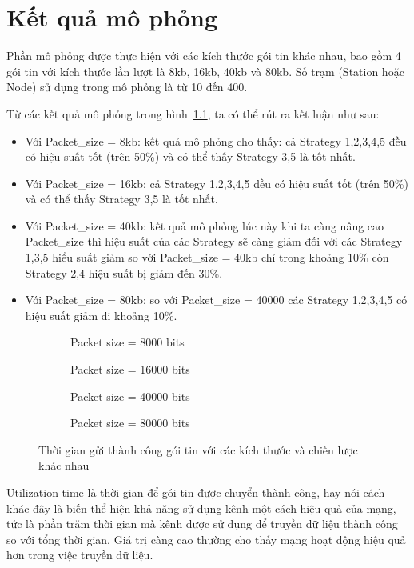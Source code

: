 \chapter{Kết quả mô phỏng}
\label{ch::chapter3}

Phần mô phỏng được thực hiện với các kích thước gói tin khác nhau, bao gồm 4 gói tin với kích thước lần lượt là 8kb, 16kb, 40kb và 80kb. Số trạm (Station hoặc Node) sử dụng trong mô phỏng là từ 10 đến 400.

Từ các kết quả mô phỏng trong hình~\ref{fig:result}, ta có thể rút ra kết luận như sau:
\begin{itemize}
    \item Với Packet\_size = 8kb: kết quả mô phỏng cho thấy: cả Strategy 1,2,3,4,5 đều có hiệu suất tốt (trên 50\%) và có thể thấy Strategy 3,5 là tốt nhất.
    \item Với Packet\_size = 16kb: cả Strategy 1,2,3,4,5 đều có hiệu suất tốt (trên 50\%) và có thể thấy Strategy 3,5 là tốt nhất.
    \item Với Packet\_size = 40kb: kết quả mô phỏng lúc này khi ta càng nâng cao Packet\_size thì hiệu suất của các Strategy sẽ càng giảm đối với các Strategy 1,3,5 hiểu suất giảm so với Packet\_size = 40kb chỉ trong khoảng 10\% còn Strategy 2,4 hiệu suất bị giảm đến 30\%.
    \item Với Packet\_size = 80kb: so với Packet\_size = 40000 các Strategy 1,2,3,4,5 có hiệu suất giảm đi khoảng 10\%.
\end{itemize}

\begin{figure}[h]
    \centering
    \begin{subfigure}{0.45\linewidth}
        
        \centering
        \caption{Packet size = 8000 bits}
    \end{subfigure}
    \hfill
    \begin{subfigure}{0.45\linewidth}
        \centering
        
        \caption{Packet size = 16000 bits}
    \end{subfigure}


    \begin{subfigure}{0.45\linewidth}
        \centering
        
        \caption{Packet size = 40000 bits}
    \end{subfigure}
    \hfill
    \begin{subfigure}{0.45\linewidth}
        \centering
        
        \caption{Packet size = 80000 bits}
    \end{subfigure}

    \caption{Thời gian gửi thành công gói tin với các kích thước và chiến lược khác nhau}
    \label{fig:result}
\end{figure}

Utilization time là thời gian để gói tin được chuyển thành công, hay nói cách khác đây là biến thể hiện khả năng sử dụng kênh một cách hiệu quả của mạng, tức là phần trăm thời gian mà kênh được sử dụng để truyền dữ liệu thành công so với tổng thời gian. Giá trị càng cao thường cho thấy mạng hoạt động hiệu quả hơn trong việc truyền dữ liệu.
